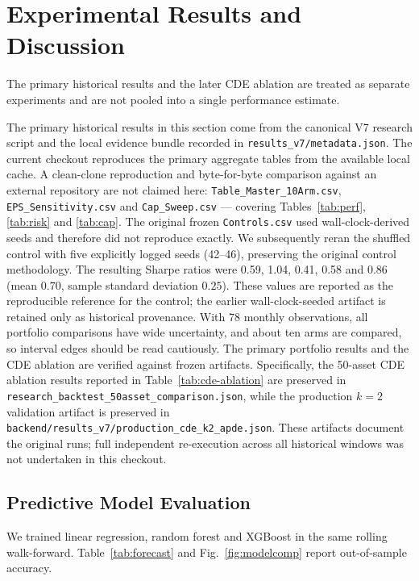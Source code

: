 \documentclass[conference]{IEEEtran}
\begin{document}
\section{Experimental Results and Discussion}
\label{sec:results}

The primary historical results and the later CDE ablation are treated
as separate experiments and are not pooled into a single performance
estimate.

The primary historical results in this section come from the canonical
V7 research script and the local evidence bundle recorded in
\texttt{results\_v7/metadata.json}. The current checkout reproduces the
primary aggregate tables from the available local cache. A clean-clone
reproduction and byte-for-byte comparison against an external repository
are not claimed here:
\texttt{Table\_Master\_10Arm.csv}, \texttt{EPS\_Sensitivity.csv} and
\texttt{Cap\_Sweep.csv} --- covering Tables~\ref{tab:perf},
\ref{tab:risk} and \ref{tab:cap}. The original frozen
\texttt{Controls.csv} used wall-clock-derived seeds and therefore did
not reproduce exactly. We subsequently reran the shuffled control with
five explicitly logged seeds (42--46), preserving the original control
methodology. The resulting Sharpe ratios were 0.59, 1.04, 0.41, 0.58 and
0.86 (mean $0.70$, sample standard deviation $0.25$). These values are
reported as the reproducible reference for the control; the earlier
wall-clock-seeded artifact is retained only as historical provenance.
With 78 monthly observations, all portfolio comparisons have wide
uncertainty, and about ten arms are compared, so interval edges should
be read cautiously. The primary portfolio results and the CDE ablation
are verified against frozen artifacts. Specifically, the 50-asset CDE
ablation results reported in Table~\ref{tab:cde-ablation} are preserved in
\texttt{research\_backtest\_50asset\_comparison.json}, while the production
$k=2$ validation artifact is preserved in
\texttt{backend/results\_v7/production\_cde\_k2\_apde.json}. These artifacts
document the original runs; full independent re-execution across all historical
windows was not undertaken in this checkout.

\subsection{Predictive Model Evaluation}
\label{sec:forecast-eval}
We trained linear regression, random forest and XGBoost in the same
rolling walk-forward. Table~\ref{tab:forecast} and
Fig.~\ref{fig:modelcomp} report out-of-sample accuracy.
\end{document}
